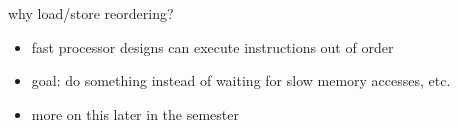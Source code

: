 \usetikzlibrary{calc}

\begin{frame}{why load/store reordering?}
\begin{itemize}
\item fast processor designs can execute instructions out of order
\item goal: do something instead of waiting for slow memory accesses, etc.
\item more on this later in the semester
\end{itemize}
\end{frame}

